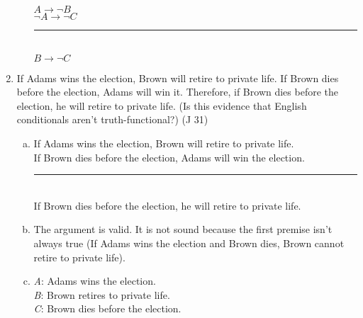 \documentclass{article}
\begin{document}
\begin{enumerate}
\begin{enumerate}[(a)]
                        $A \to \neg B$\\
                        $\neg A \to \neg C$\\
                        \rule{5em}{.5pt}\\
                        $B \to \neg C$
            \end{enumerate}
      \item If Adams wins the election, Brown will retire to private life. If Brown dies before the election, Adams will win it. Therefore, if Brown dies before the election, he will retire to private life. (Is this evidence that English conditionals aren't truth-functional?) (J 31)
            \begin{enumerate}[(a)]
                  \item If Adams wins the election, Brown will retire to private life.\\
                        If Brown dies before the election, Adams will win the election.\\
                        \rule{15em}{.5pt}\\
                        If Brown dies before the election, he will retire to private life.
                  \item The argument is valid. It is not sound because the first premise isn't always true (If Adams wins the election and Brown dies, Brown cannot retire to private life).
                  \item \textit{A}: Adams wins the election.\\
                        \textit{B}: Brown retires to private life.\\
                        \textit{C}: Brown dies before the election.\\


\end{enumerate}
\end{enumerate}
\end{document}
